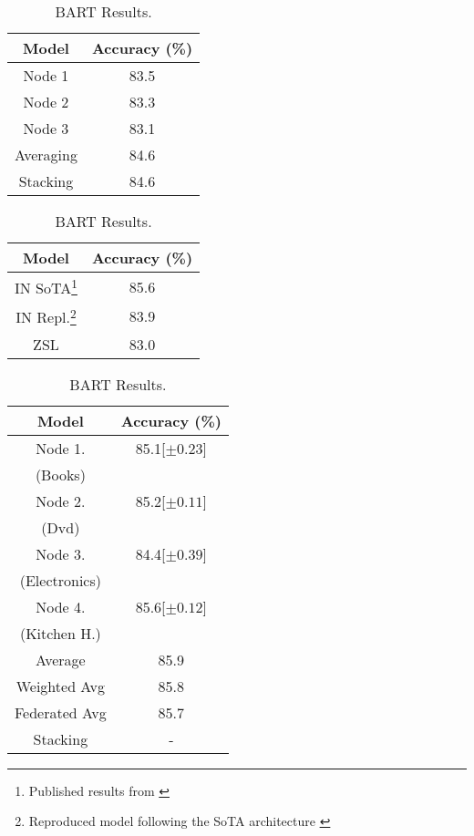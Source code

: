 \documentclass{esannV2}
\begin{document}
\begin{table}[!htb]
    \begin{minipage}[t]{.5\linewidth}
      \vspace{-80pt}
      \centering
        \begin{tabular}{|c|c|}
        \hline
        Model & Accuracy (\%) \\
        \hline
        Node 1 & 83.5 \\
        Node 2 & 83.3 \\
        Node 3 & 83.1 \\
        Averaging & 84.6 \\
        Stacking & 84.6 \\
        \hline
        \end{tabular}
        \caption{IN Results.}\label{Tab:in_results}
      \vspace{15pt}
      \centering
      \begin{tabular}{|c|c|}
        \hline
        Model & Accuracy (\%) \\
        \hline
        IN SoTA\footnote{Published results from \cite{geng-etal-2019-induction}} & 85.6\\
        IN Repl.\footnote{Reproduced model following the SoTA architecture \cite{geng-etal-2019-induction}} & 83.9\\
        
        ZSL & 83.0\\
        \hline
      \end{tabular}
      \caption{Baselines.}
      \label{Tab:baselines}
    \end{minipage}%
    \begin{minipage}[t]{.5\linewidth}
      \centering
        \begin{tabular}{|c|c|}        
        \hline
        Model & Accuracy (\%) \\
        \hline
        Node 1.& 85.1[$\pm 0.23$]\\ (Books) &\\
        Node 2.&85.2[$\pm 0.11$]\\ (Dvd) & \\
        Node 3.&84.4[$\pm 0.39$]\\ (Electronics) & \\
        Node 4.&85.6[$\pm 0.12$]\\ (Kitchen H.) & \\
        Average & 85.9\\
        Weighted Avg & 85.8\\
        Federated Avg & 85.7\\
        Stacking & -\\ 
          \hline
        \end{tabular}
        \caption{BART Results.}\label{Tab:bart_results}
    \end{minipage} 
\end{table}
        
\end{document}

